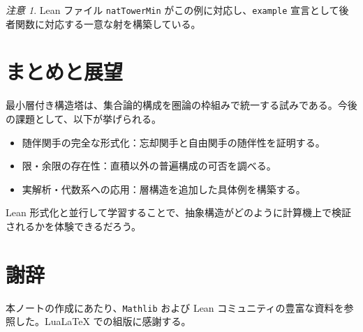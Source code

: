 \documentclass[a4paper]{ltjsarticle}
\theoremstyle{definition}
\theoremstyle{plain}
\theoremstyle{remark}
\newtheorem{remark}[definition]{注意}
\begin{document}
\begin{remark}
Lean ファイル \texttt{natTowerMin} がこの例に対応し、\texttt{example} 宣言として後者関数に対応する一意な射を構築している。
\end{remark}

\section{まとめと展望}
最小層付き構造塔は、集合論的構成を圏論の枠組みで統一する試みである。今後の課題として、以下が挙げられる。
\begin{itemize}
  \item 随伴関手の完全な形式化：忘却関手と自由関手の随伴性を証明する。
  \item 限・余限の存在性：直積以外の普遍構成の可否を調べる。
  \item 実解析・代数系への応用：層構造を追加した具体例を構築する。
\end{itemize}
Lean 形式化と並行して学習することで、抽象構造がどのように計算機上で検証されるかを体験できるだろう。

\section*{謝辞}
本ノートの作成にあたり、\texttt{Mathlib} および Lean コミュニティの豊富な資料を参照した。Lua\LaTeX{} での組版に感謝する。
\end{document}
